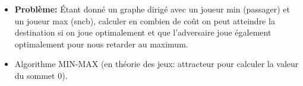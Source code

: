 \begin{frame}
    \frametitle{\problemtitle}
    \begin{itemize}
        \item<+-> \textbf{Problème:} Étant donné un graphe dirigé avec un joueur min (passager) et un joueur max (sncb), calculer en combien de coût on peut atteindre la destination si on joue optimalement et que l'adversaire joue également optimalement pour nous retarder au maximum.
        \item<+-> Algorithme MIN-MAX (en théorie des jeux: attracteur pour calculer la valeur du sommet $0$).
    \end{itemize}
    \solvestats
\end{frame}
